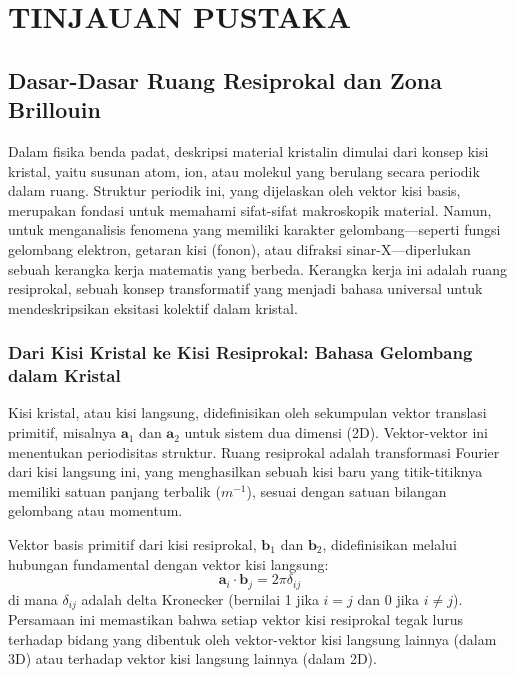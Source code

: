 \renewcommand{\thechapter}{\Roman{chapter}}
\chapter{TINJAUAN PUSTAKA}
\renewcommand{\thechapter}{\arabic{chapter}}


\section{Dasar-Dasar Ruang Resiprokal dan Zona Brillouin}
Dalam fisika benda padat, deskripsi material kristalin dimulai dari konsep kisi kristal, yaitu susunan atom, ion, atau molekul yang berulang secara periodik dalam ruang. Struktur periodik ini, yang dijelaskan oleh vektor kisi basis, merupakan fondasi untuk memahami sifat-sifat makroskopik material. Namun, untuk menganalisis fenomena yang memiliki karakter gelombang—seperti fungsi gelombang elektron, getaran kisi (fonon), atau difraksi sinar-X—diperlukan sebuah kerangka kerja matematis yang berbeda. Kerangka kerja ini adalah ruang resiprokal, sebuah konsep transformatif yang menjadi bahasa universal untuk mendeskripsikan eksitasi kolektif dalam kristal.

\subsection{Dari Kisi Kristal ke Kisi Resiprokal: Bahasa Gelombang dalam Kristal}
Kisi kristal, atau kisi langsung, didefinisikan oleh sekumpulan vektor translasi primitif, misalnya $\mathbf{a}_1$ dan $\mathbf{a}_2$ untuk sistem dua dimensi (2D). Vektor-vektor ini menentukan periodisitas struktur. Ruang resiprokal adalah transformasi Fourier dari kisi langsung ini, yang menghasilkan sebuah kisi baru yang titik-titiknya memiliki satuan panjang terbalik ($m^{-1}$), sesuai dengan satuan bilangan gelombang atau momentum.

Vektor basis primitif dari kisi resiprokal, $\mathbf{b}_1$ dan $\mathbf{b}_2$, didefinisikan melalui hubungan fundamental dengan vektor kisi langsung:
\[
\mathbf{a}_i \cdot \mathbf{b}_j = 2\pi \delta_{ij}
\]
di mana $\delta_{ij}$ adalah delta Kronecker (bernilai 1 jika $i=j$ dan 0 jika $i \neq j$). Persamaan ini memastikan bahwa setiap vektor kisi resiprokal tegak lurus terhadap bidang yang dibentuk oleh vektor-vektor kisi langsung lainnya (dalam 3D) atau terhadap vektor kisi langsung lainnya (dalam 2D).

